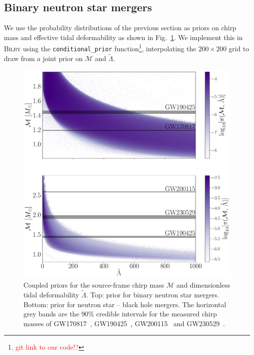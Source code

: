 \documentclass[twocolumn]{aastex631}
\newcommand{\red}[1]{\textcolor{red}{#1}}
\begin{document}
\subsection{Binary neutron star mergers}
We use the probability distributions of the previous section as priors on chirp mass and effective tidal deformability as shown in Fig.~\ref{fig:priors}. We implement this in \textsc{Bilby} using the \verb!conditional_prior! function\footnote{\red{git link to our code!?}},
interpolating the $200\times200$ grid to draw from a joint prior on $\mathcal{M}$ and $\tilde{\Lambda}$. 
	\begin{figure}
		\centering
		\includegraphics[width=1.\linewidth]{Fig_1_Physics_priors.pdf}
		\caption{Coupled priors for the source-frame chirp mass $\mathcal{M}$ and dimensionless tidal deformability $\tilde{\Lambda}$. Top: prior for binary neutron star mergers. Bottom: prior for neutron star -- black hole mergers. The horizontal grey bands are the 90\% credible intervals for the measured chirp masses of GW170817~\citep{abbott17_170817observation}, GW190425~\citep{abbott20_190425}, GW200115~\citep{GW200115} and GW230529~\citep{GW230529}.} 
		\label{fig:priors}
	\end{figure}
	
\end{document}
